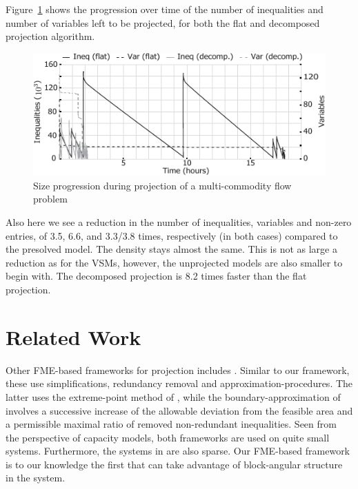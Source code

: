 \documentclass{llncs}
\begin{document}
Figure~\ref{fig:multicom} shows the progression over time of the number of inequalities and number of variables left to be projected, for both the flat and decomposed projection algorithm.
\begin{figure}[tb]
	\centering
		\includegraphics{figures/newMultiComGraph2.pdf}
	\caption{Size progression during projection of a multi-commodity flow problem}
	\label{fig:multicom}
\end{figure}
Also here we see a reduction in the number of inequalities, variables and non-zero entries, of 3.5, 6.6, and 3.3/3.8 times, respectively (in both cases) compared to the presolved model. The density stays almost the same. %
This is not as large a reduction as for the VSMs, however, the unprojected models are also smaller to begin with. The decomposed projection is 8.2 times faster than the flat projection.

\section{Related Work} \label{sec:relatedwork}
Other FME-based frameworks for projection includes \cite{simon05,lukatskii08,shapot12}. Similar to our framework, these use simplifications, redundancy removal and approximation-procedures. The latter uses the extreme-point method of \cite{huynh92}, while the boundary-approximation of \cite{lukatskii08,shapot12} involves a successive increase of the allowable deviation from the feasible area and a permissible maximal ratio of removed non-redundant inequalities. Seen from the perspective of capacity models, both frameworks are used on quite small systems. Furthermore, the systems in \cite{simon05} are also sparse. Our FME-based framework is to our knowledge the first that can take advantage of block-angular structure in the system. 
\end{document}
